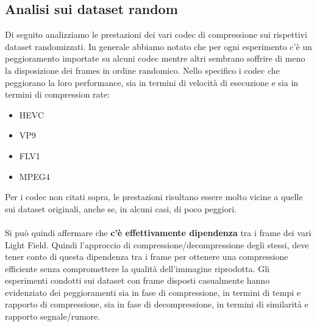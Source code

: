 \subsection{Analisi sui dataset random}
Di seguito analizziamo le prestazioni dei vari codec di compressione sui rispettivi dataset randomizzati.
In generale abbiamo notato che per ogni esperimento c'è un peggioramento importate su alcuni codec mentre altri sembrano soffrire di meno la disposizione dei frames in ordine randomico. 
Nello specifico i codec che peggiorano la loro performance, sia in termini di velocità di esecuzione e sia in termini di compression rate:
\begin{itemize}
    \item HEVC 
    \item VP9  
    \item FLV1
    \item MPEG4
\end{itemize}
Per i codec non citati sopra, le prestazioni risultano essere molto vicine a quelle sui dataset originali, anche se, in alcuni casi, di poco peggiori.
\\
\\
Si può quindi affermare che \textbf{c'è effettivamente dipendenza} tra i frame dei vari Light Field. Quindi l'approccio di compressione/decompressione degli stessi, deve tener conto di questa dipendenza tra i frame per ottenere una compressione efficiente senza compromettere la qualità dell'immagine riprodotta. Gli esperimenti condotti sui dataset con frame disposti casualmente hanno evidenziato dei peggioramenti sia in fase di compressione, in termini di tempi e rapporto di compressione, sia in fase di decompressione, in termini di similarità e rapporto  segnale/rumore.  